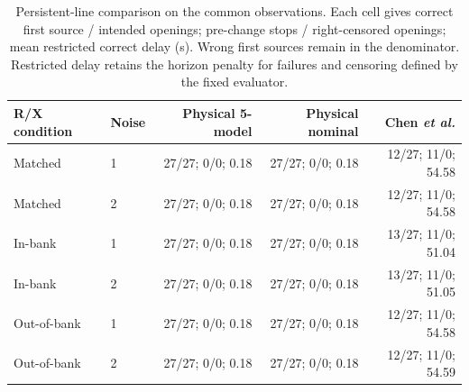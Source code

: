 \begin{table}[t]\centering\small
\caption{Persistent-line comparison on the common observations. Each cell gives correct first source / intended openings; pre-change stops / right-censored openings; mean restricted correct delay (s). Wrong first sources remain in the denominator. Restricted delay retains the horizon penalty for failures and censoring defined by the fixed evaluator.}
\label{tab:c01_first_stop}
\begin{tabular}{llrrr}\toprule
R/X condition & Noise & Physical 5-model & Physical nominal & Chen \emph{et al.}\\\midrule
Matched & 1 & 27/27; 0/0; 0.18 & 27/27; 0/0; 0.18 & 12/27; 11/0; 54.58\\
Matched & 2 & 27/27; 0/0; 0.18 & 27/27; 0/0; 0.18 & 12/27; 11/0; 54.58\\
In-bank & 1 & 27/27; 0/0; 0.18 & 27/27; 0/0; 0.18 & 13/27; 11/0; 51.04\\
In-bank & 2 & 27/27; 0/0; 0.18 & 27/27; 0/0; 0.18 & 13/27; 11/0; 51.05\\
Out-of-bank & 1 & 27/27; 0/0; 0.18 & 27/27; 0/0; 0.18 & 12/27; 11/0; 54.58\\
Out-of-bank & 2 & 27/27; 0/0; 0.18 & 27/27; 0/0; 0.18 & 12/27; 11/0; 54.59\\
\bottomrule\end{tabular}\end{table}
